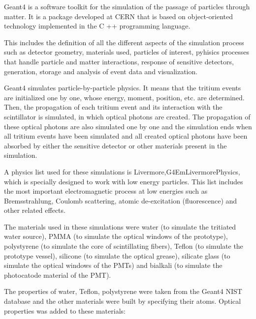 Geant4 is a software toolkit for the simulation of the passage of particles through matter. It is a package developed at CERN that is based on object-oriented technology implemented in the C ++ programming language.

This includes the definition of all the different aspects of the simulation process such as detector geometry, materials used, particles of interest, pyhisics processes that handle particle and matter interactions, response of sensitive detectors, generation, storage and analysis of event data and visualization.

Geant4 simulates particle-by-particle physics. It means that the tritium events are initialized one by one, whose energy, moment, position, etc. are determined. Then, the propagation of each tritium event and its interaction  with the scintillator is simulated, in which optical photons are created. The propagation of these optical photons are also simulated one by one and the simulation ends when all tritium events have been simulated and all created optical photons have been absorbed by either the sensitive detector or other materials present in the simulation.

A physics list used for these simulations is Livermore,\newline G4EmLivermorePhysics, which is specially designed to work with low energy particles. This list includes the most important electromagnetic process at low energies such as Bremsstrahlung, Coulomb scattering, atomic de-excitation (fluorescence) and other related effects.

The materials used in these simulations were water (to simulate the tritiated water source), PMMA (to simulate the optical windows of the prototype), polystyrene (to simulate the core of scintillating fibers), Teflon (to simulate the prototype vessel), silicone (to simulate the optical grease), silicate glass (to simulate the optical windows of the PMTs) and bialkali (to simulate the photocatode material of the PMT).

The properties of water, Teflon, polystyrene were taken from the Geant4 NIST database and the other materials were built by specifying their atoms. Optical properties was added to these materials:

